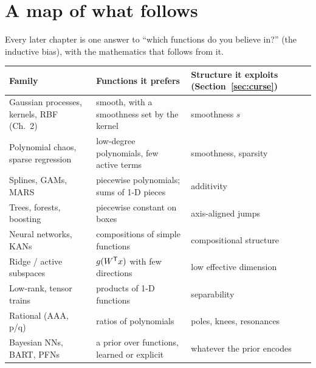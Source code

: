 \section{A map of what follows}

Every later chapter is one answer to ``which functions do you believe in?'' (the inductive bias), with the
mathematics that follows from it.

\begin{center}
\small
\begin{tabular}{p{3.6cm}p{5.2cm}p{4.6cm}}
\toprule
Family & Functions it prefers & Structure it exploits (Section~\ref{sec:curse}) \\
\midrule
Gaussian processes, kernels, RBF (Ch.~2) & smooth, with a smoothness set by the kernel & smoothness $s$ \\
Polynomial chaos, sparse regression & low-degree polynomials, few active terms & smoothness, sparsity \\
Splines, GAMs, MARS & piecewise polynomials; sums of 1-D pieces & additivity \\
Trees, forests, boosting & piecewise constant on boxes & axis-aligned jumps \\
Neural networks, KANs & compositions of simple functions & compositional structure \\
Ridge / active subspaces & $g(W^{\mathsf{T}} x)$ with few directions & low effective dimension \\
Low-rank, tensor trains & products of 1-D functions & separability \\
Rational (AAA, p/q) & ratios of polynomials & poles, knees, resonances \\
Bayesian NNs, BART, PFNs & a prior over functions, learned or explicit & whatever the prior encodes \\
\bottomrule
\end{tabular}
\end{center}

